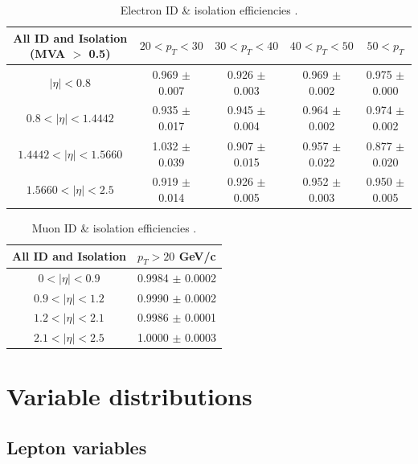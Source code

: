 \documentclass[oneside, a4paper, 11pt, ]{report}
\begin{document}
\begin{table} 
\begin{center}
\resizebox{\columnwidth}{!} {
\begin{tabular}{|c|c|c|c|c|}
\hline
	\textbf{All ID and Isolation (MVA $>$ 0.5)} & $20 < p_T < 30$ & $30 < p_T < 40$ & $40 < p_T < 50$ & $50 < p_T$ \\
\hline	
	$|\eta| < 0.8$ & 0.969 $\pm$ 0.007 & 0.926 $\pm$ 0.003 & 0.969 $\pm$ 0.002 & 0.975 $\pm$ 0.000 \\
	$0.8 < |\eta| < 1.4442$ & 0.935 $\pm$ 0.017 & 0.945 $\pm$ 0.004 & 0.964 $\pm$ 0.002 & 0.974 $\pm$ 0.002 \\
	$1.4442 < |\eta| < 1.5660$ & 1.032 $\pm$ 0.039 & 0.907 $\pm$ 0.015 & 0.957 $\pm$ 0.022 & 0.877 $\pm$ 0.020 \\
	$1.5660 < |\eta| < 2.5$ & 0.919 $\pm$ 0.014 & 0.926 $\pm$ 0.005 & 0.952 $\pm$ 0.003 & 0.950 $\pm$ 0.005 \\
\hline	
\end{tabular}
}
\end{center}
\caption{Electron ID \& isolation efficiencies \cite{ElectronEfficiencies}.}
\label{tab-ElectronEfficiencies}
\end{table}

\begin{table} 
\begin{center}
\begin{tabular}{|c|c|}
\hline
	\textbf{All ID and Isolation} & $p_T > 20$ GeV/c \\
\hline	
	$0 < |\eta| < 0.9$ & 0.9984 $\pm$ 0.0002 \\
	$0.9 < |\eta| < 1.2$ & 0.9990 $\pm$ 0.0002 \\
	$1.2 < |\eta| < 2.1$ & 0.9986 $\pm$ 0.0001 \\
	$2.1 < |\eta| < 2.5$ & 1.0000 $\pm$ 0.0003 \\
\hline	
\end{tabular}
\end{center}
\caption{Muon ID \& isolation efficiencies \cite{MuonEfficiencies}.}
\label{tab-MuonEfficiencies}
\end{table}

\section{Variable distributions}

\subsection{Lepton variables}
\end{document}
